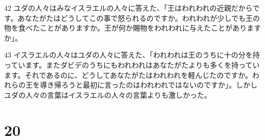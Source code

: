 \par 42 ユダの人々はみなイスラエルの人々に答えた、「王はわれわれの近親だからです。あなたがたはどうしてこの事で怒られるのですか。われわれが少しでも王の物を食べたことがありますか。王が何か賜物をわれわれに与えたことがありますか」。
\par 43 イスラエルの人々はユダの人々に答えた、「われわれは王のうちに十の分を持っています。またダビデのうちにもわれわれはあなたがたよりも多くを持っています。それであるのに、どうしてあなたがたはわれわれを軽んじたのですか。われらの王を導き帰ろうと最初に言ったのはわれわれではないのですか」。しかしユダの人々の言葉はイスラエルの人々の言葉よりも激しかった。

\chapter{20}

